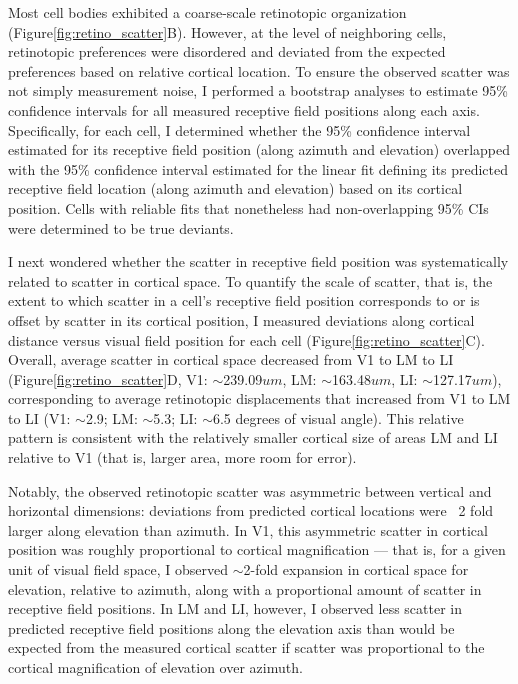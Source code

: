 Most cell bodies exhibited a coarse-scale retinotopic organization (Figure\ref{fig:retino_scatter}B). However, at the level of neighboring cells, retinotopic preferences were disordered and deviated from the expected preferences based on relative cortical location. To ensure the observed scatter was not simply measurement noise, I performed a bootstrap analyses to estimate 95\% confidence intervals for all measured receptive field positions along each axis. Specifically, for each cell, I determined whether the 95\% confidence interval estimated for its receptive field position (along azimuth and elevation) overlapped with the 95\% confidence interval estimated for the linear fit defining its predicted receptive field location (along azimuth and elevation) based on its cortical position. Cells with reliable fits that nonetheless had non-overlapping 95\% CIs were determined to be true deviants. 

I next wondered whether the scatter in receptive field position was systematically related to scatter in cortical space. To quantify the scale of scatter, that is, the extent to which scatter in a cell's receptive field position corresponds to or is offset by scatter in its cortical position, I measured deviations along cortical distance versus visual field position for each cell (Figure\ref{fig:retino_scatter}C). Overall, average scatter in cortical space decreased from V1 to LM to LI (Figure\ref{fig:retino_scatter}D, V1: $\sim$239.09$um$, LM: $\sim$163.48$um$, LI: $\sim$127.17$um$), corresponding to average retinotopic displacements that increased from V1 to LM to LI (V1: $\sim$2.9; LM: $\sim$5.3; LI: $\sim$6.5 degrees of visual angle). This relative pattern is consistent with the relatively smaller cortical size of areas LM and LI relative to V1 (that is, larger area, more room for error).  

Notably, the observed retinotopic scatter was asymmetric between vertical and horizontal dimensions:  deviations from predicted cortical locations were ~2 fold larger along elevation than azimuth. In V1, this asymmetric scatter in cortical position was roughly proportional to cortical magnification --- that is, for a given unit of visual field space, I observed $\sim$2-fold expansion in cortical space  for elevation, relative to azimuth, along with a proportional amount of scatter in receptive field positions. In LM and LI, however, I observed less scatter in predicted receptive field positions along the elevation axis than would be expected from the measured cortical scatter if scatter was proportional to the cortical magnification of elevation over azimuth.

